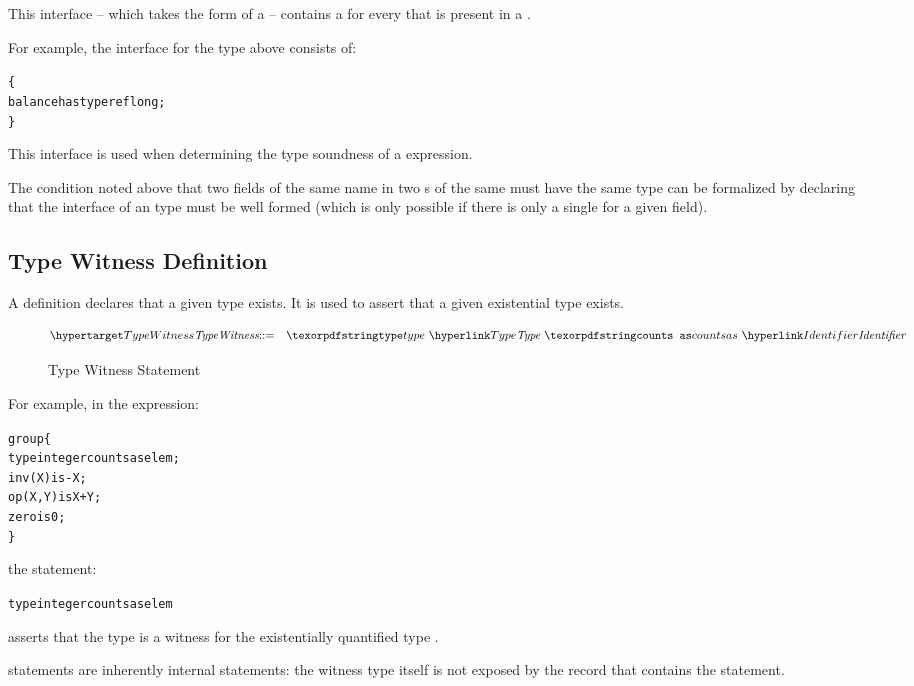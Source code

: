 This interface -- which takes the form of a  -- contains a  for every  that is present in a .

For example, the interface for the  type above consists of:
\begin{alltt}
\{
  balance has type ref long;
\}
\end{alltt}

This interface is used when determining the type soundness of a  expression.
\begin{aside}
The condition noted above that two fields of the same name in two s of the same  must have the same type can be formalized by declaring that the interface of an  type must be well formed (which is only possible if there is only a single  for a given field).
\end{aside}

\subsection{Type Witness Definition}
\label{countsAs}

A  definition declares that a given type exists. It is used to assert that a given existential type exists.

\begin{figure}[htbp]
\begin{eqnarray*}
\ntDef{TypeWitness}&\arrow&\q{type}\ \ntRef{Type}\ \q{counts as}\ \ntRef{Identifier}
\end{eqnarray*}
\caption{Type Witness Statement}
\label{typeCountsAsFig}
\end{figure}

For example, in the expression:
\begin{alltt}
group\{
  type integer counts as elem;
  inv(X) is -X;
  op(X,Y) is X+Y;
  zero is 0;
\}
\end{alltt}
the statement:
\begin{alltt}
type integer counts as elem
\end{alltt}
asserts that the type  is a witness for the existentially quantified type .
\begin{aside}
 statements are inherently internal statements: the witness type itself is not exposed by the record that contains the  statement.
\end{aside}


